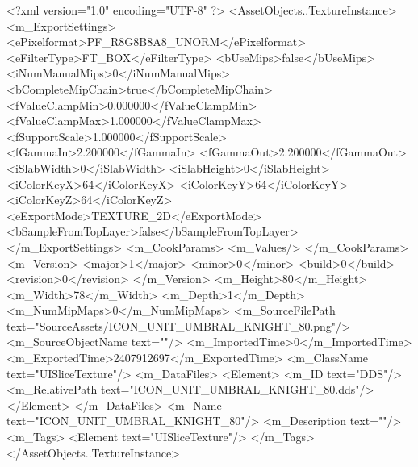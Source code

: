 <?xml version="1.0" encoding="UTF-8" ?>
<AssetObjects..TextureInstance>
	<m_ExportSettings>
		<ePixelformat>PF_R8G8B8A8_UNORM</ePixelformat>
		<eFilterType>FT_BOX</eFilterType>
		<bUseMips>false</bUseMips>
		<iNumManualMips>0</iNumManualMips>
		<bCompleteMipChain>true</bCompleteMipChain>
		<fValueClampMin>0.000000</fValueClampMin>
		<fValueClampMax>1.000000</fValueClampMax>
		<fSupportScale>1.000000</fSupportScale>
		<fGammaIn>2.200000</fGammaIn>
		<fGammaOut>2.200000</fGammaOut>
		<iSlabWidth>0</iSlabWidth>
		<iSlabHeight>0</iSlabHeight>
		<iColorKeyX>64</iColorKeyX>
		<iColorKeyY>64</iColorKeyY>
		<iColorKeyZ>64</iColorKeyZ>
		<eExportMode>TEXTURE_2D</eExportMode>
		<bSampleFromTopLayer>false</bSampleFromTopLayer>
	</m_ExportSettings>
	<m_CookParams>
		<m_Values/>
	</m_CookParams>
	<m_Version>
		<major>1</major>
		<minor>0</minor>
		<build>0</build>
		<revision>0</revision>
	</m_Version>
	<m_Height>80</m_Height>
	<m_Width>78</m_Width>
	<m_Depth>1</m_Depth>
	<m_NumMipMaps>0</m_NumMipMaps>
	<m_SourceFilePath text="SourceAssets/ICON_UNIT_UMBRAL_KNIGHT_80.png"/>
	<m_SourceObjectName text=""/>
	<m_ImportedTime>0</m_ImportedTime>
	<m_ExportedTime>2407912697</m_ExportedTime>
	<m_ClassName text="UISliceTexture"/>
	<m_DataFiles>
		<Element>
			<m_ID text="DDS"/>
			<m_RelativePath text="ICON_UNIT_UMBRAL_KNIGHT_80.dds"/>
		</Element>
	</m_DataFiles>
	<m_Name text="ICON_UNIT_UMBRAL_KNIGHT_80"/>
	<m_Description text=""/>
	<m_Tags>
		<Element text="UISliceTexture"/>
	</m_Tags>
</AssetObjects..TextureInstance>


